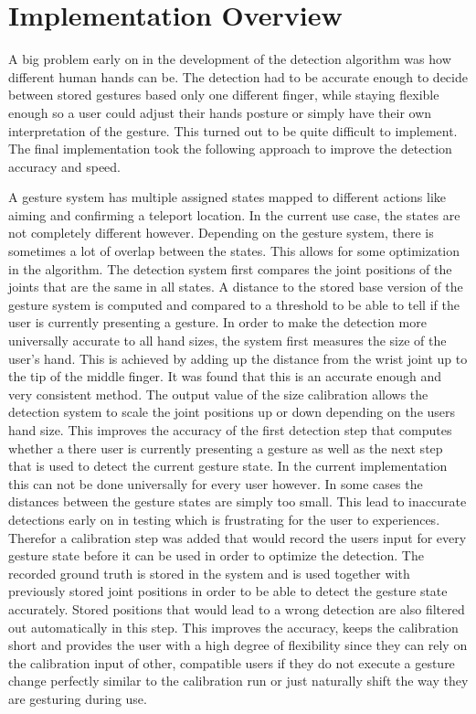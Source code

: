 \chapter{Implementation Overview}
\label{cha:ImplementationOverview}

A big problem early on in the development of the detection algorithm was how different human hands can be. The detection had to be accurate enough to decide between stored gestures based only one different finger, while staying flexible enough so a user could adjust their hands posture or simply have their own interpretation of the gesture. This turned out to be quite difficult to implement. The final implementation took the following approach to improve the detection accuracy and speed.

A gesture system has multiple assigned states mapped to different actions like aiming and confirming a teleport location. In the current use case, the states are not completely different however. Depending on the gesture system, there is sometimes a lot of overlap between the states. This allows for some optimization in the algorithm. The detection system first compares the joint positions of the joints that are the same in all states. A distance to the stored base version of the gesture system is computed and compared to a threshold to be able to tell if the user is currently presenting a gesture. In order to make the detection more universally accurate to all hand sizes, the system first measures the size of the user's hand. This is achieved by adding up the distance from the wrist joint up to the tip of the middle finger. It was found that this is an accurate enough and very consistent method. The output value of the size calibration allows the detection system to scale the joint positions up or down depending on the users hand size. This improves the accuracy of the first detection step that computes whether a there user is currently presenting a gesture as well as the next step that is used to detect the current gesture state. In the current implementation this can not be done universally for every user however. In some cases the distances between the gesture states are simply too small. This lead to inaccurate detections early on in testing which is frustrating for the user to experiences. Therefor a calibration step was added that would record the users input for every gesture state before it can be used in order to optimize the detection. The recorded ground truth is stored in the system and is used together with previously stored joint positions in order to be able to detect the gesture state accurately. Stored positions that would lead to a wrong detection are also filtered out automatically in this step. This improves the accuracy, keeps the calibration short and provides the user with a high degree of flexibility since they can rely on the calibration input of other, compatible users if they do not execute a gesture change perfectly similar to the calibration run or just naturally shift the way they are gesturing during use.